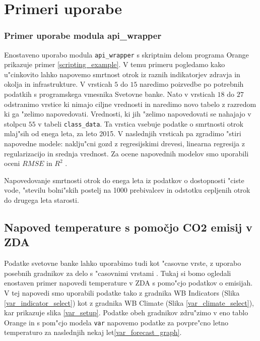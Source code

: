 \chapter{Primeri uporabe}




\subsection{Primer uporabe modula api\_wrapper}

Enostaveno uporabo modula \verb|api_wrapper| s skriptnim delom programa Orange
prikazuje primer \ref{scripting_example}. V temu primeru pogledamo kako
u"cinkovito lahko napovemo smrtnost otrok iz raznih indikatorjev zdravja in
okolja in infrastrukture. V vrsticah $5$ do $15$ naredimo poizvedbe po
potrebnih podatkih s programskega vmesnika Svetovne banke. Nato v vrsticah $18$
do $27$ odstranimo vrstice ki nimajo ciljne vrednosti in naredimo novo tabelo z
razredom ki ga "zelimo napovedovati. Vrednosti, ki jih "zelimo napovedovati se
nahajajo v stolpcu $55$ v tabeli \verb|class_data|. Ta vrstica vsebuje podatke
o smrtnosti otrok mlaj"sih od enega leta, za leto 2015. V naslednjih vrsticah
pa zgradimo "stiri napovedne modele: naklju"cni gozd z
regresijskimi drevesi, linearna regresija z regularizacijo in srednja vrednost.
Za ocene napovednih modelov smo uporabili oceni
$RMSE$  in 
$R^2$ .


\begin{snippet}
\begin{center}

\end{center}
\cprotect
\caption{Napovedovanje smrtnosti otrok do enega leta iz podatkov o dostopnosti
  "ciste vode, "stevilu bolni"skih postelj na 1000 prebivalcev in odstotku
  cepljenih otrok do drugega leta starosti.}
\label{scripting_example}
\end{snippet} 



\section{Napoved temperature s pomočjo CO2 emisij v ZDA}


Podatke svetovne banke lahko uporabimo tudi kot "casovne vrste, z uporabo
posebnih gradnikov za delo s "casovnimi vrstami \cite{time_series}. Tukaj si
bomo ogledali enostaven primer napovedi temperature v ZDA s pomo"cjo podatkov o
emisijah. V tej napovedi smo uporabili podatke tako z gradnika WB Indicators
(Slika \ref{var_indicator_select})
kot z gradnika WB Climate (Slika \ref{var_climate_select}), 
kar prikazuje slika \ref{var_setup}. Podatke obeh gradnikov zdru"zimo v eno 
tablo Orange in s pom"cjo modela \verb|var| napovemo podatke za povpre"cno 
letno temperaturo za naslednjih nekaj let\ref{var_forecast_graph}.

